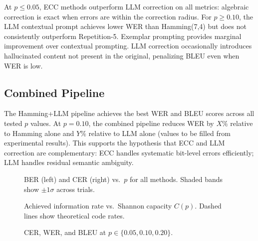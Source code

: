 At $p \leq 0.05$, ECC methods outperform LLM correction on all metrics:
algebraic correction is exact when errors are within the correction radius.
For $p \geq 0.10$, the LLM contextual prompt achieves lower WER than
Hamming(7,4) but does not consistently outperform Repetition-5.
Exemplar prompting provides marginal improvement over contextual prompting.
LLM correction occasionally introduces hallucinated content not present in
the original, penalizing BLEU even when WER is low.

\subsection{Combined Pipeline}

The Hamming+LLM pipeline achieves the best WER and BLEU scores across all
tested $p$ values.  At $p=0.10$, the combined pipeline reduces WER by
$X\%$ relative to Hamming alone and $Y\%$ relative to LLM alone (values
to be filled from experimental results). This supports the hypothesis that
ECC and LLM correction are complementary: ECC handles systematic bit-level
errors efficiently; LLM handles residual semantic ambiguity.

\begin{figure}[t]
  \centering
  \caption{BER (left) and CER (right) vs.\ $p$ for all methods.
           Shaded bands show $\pm 1\sigma$ across trials.}
  \label{fig:ber}
\end{figure}

\begin{figure}[t]
  \centering
  \caption{Achieved information rate vs.\ Shannon capacity $C(p)$.
           Dashed lines show theoretical code rates.}
  \label{fig:capacity}
\end{figure}

\begin{figure}[t]
  \centering
  \caption{CER, WER, and BLEU at $p \in \{0.05, 0.10, 0.20\}$.}
  \label{fig:text}
\end{figure}
